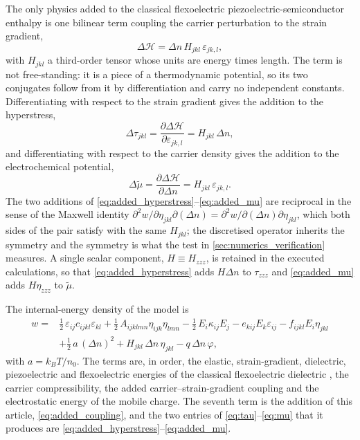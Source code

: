 The only physics added to the classical flexoelectric piezoelectric-semiconductor
enthalpy is one bilinear term coupling the carrier perturbation to the strain
gradient,
\begin{equation}
\label{eq:added_coupling}
\Delta\mathcal{H}=\Delta n\,H_{jkl}\,\varepsilon_{jk,l},
\end{equation}
with $H_{jkl}$ a third-order tensor whose units are energy times length.  The
term is not free-standing: it is a piece of a thermodynamic potential, so its two
conjugates follow from it by differentiation and carry no independent constants.
Differentiating with respect to the strain gradient gives the addition to the
hyperstress,
\begin{equation}
\label{eq:added_hyperstress}
\Delta\tau_{jkl}=\frac{\partial\Delta\mathcal{H}}{\partial\varepsilon_{jk,l}}
=H_{jkl}\,\Delta n ,
\end{equation}
and differentiating with respect to the carrier density gives the addition to the
electrochemical potential,
\begin{equation}
\label{eq:added_mu}
\Delta\widetilde\mu=\frac{\partial\Delta\mathcal{H}}{\partial\Delta n}
=H_{jkl}\,\varepsilon_{jk,l} .
\end{equation}
The two additions of \eqref{eq:added_hyperstress}--\eqref{eq:added_mu} are
reciprocal in the sense of the Maxwell identity
$\partial^{2}w/\partial\eta_{jkl}\partial(\Delta n)
=\partial^{2}w/\partial(\Delta n)\partial\eta_{jkl}$, which both sides of the
pair satisfy with the same $H_{jkl}$; the discretised operator inherits the
symmetry and the symmetry is what the test in
\cref{sec:numerics_verification} measures.  A single scalar component,
$H\equiv H_{zzz}$, is retained in the executed calculations, so that
\eqref{eq:added_hyperstress} adds $H\Delta n$ to $\tau_{zzz}$ and
\eqref{eq:added_mu} adds $H\eta_{zzz}$ to $\widetilde\mu$.

The internal-energy density of the model is
\begin{equation}
\label{eq:enthalpy}
\begin{aligned}
w={}&\tfrac12\,\varepsilon_{ij}c_{ijkl}\varepsilon_{kl}
+\tfrac12\,A_{ijklmn}\eta_{ijk}\eta_{lmn}
-\tfrac12\,E_i\kappa_{ij}E_j
-e_{kij}E_k\varepsilon_{ij}
-f_{ijkl}E_i\eta_{jkl}\\
&+\tfrac12\,a\,(\Delta n)^2
+H_{jkl}\,\Delta n\,\eta_{jkl}
-q\,\Delta n\,\varphi ,
\end{aligned}
\end{equation}
with $a=k_BT/n_0$.  The terms are, in order, the elastic, strain-gradient,
dielectric, piezoelectric and flexoelectric energies of the classical
flexoelectric dielectric \cite{shen2010theory}, the carrier compressibility, the
added carrier--strain-gradient coupling and the electrostatic energy of the
mobile charge.  The seventh term is the addition of this article, \eqref{eq:added_coupling},
and the two entries of \eqref{eq:tau}--\eqref{eq:mu} that it produces are
\eqref{eq:added_hyperstress}--\eqref{eq:added_mu}.

